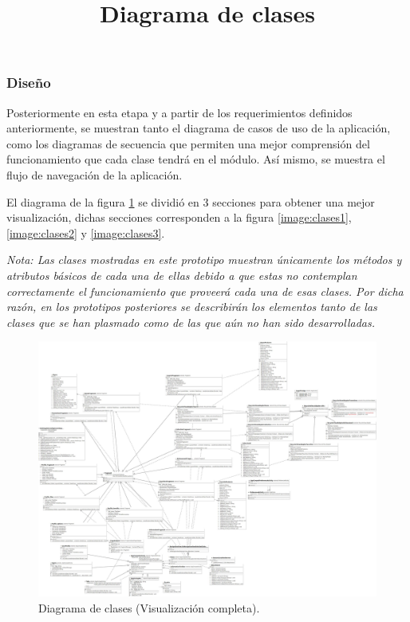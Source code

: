 \subsubsection{Diseño}
Posteriormente en esta etapa y a partir de los requerimientos definidos anteriormente, se muestran tanto el diagrama de casos de uso de la aplicación, como los diagramas de secuencia que permiten una mejor comprensión del funcionamiento que cada clase tendrá en el módulo. Así mismo, se muestra el flujo de navegación de la aplicación.
\\ \par
\title{\textbf{Diagrama de clases}\\ \par}
El diagrama de la figura \ref{image:clases} se dividió en 3 secciones para obtener una mejor visualización, dichas secciones corresponden a la figura \ref{image:clases1}, \ref{image:clases2} y \ref{image:clases3}.\\ \par 
\textit{Nota: Las clases mostradas en este prototipo muestran únicamente los métodos y atributos básicos de cada una de ellas debido a que estas no contemplan correctamente el funcionamiento que proveerá cada una de esas clases. Por dicha razón, en los prototipos posteriores se describirán  los elementos tanto de las clases que se han plasmado como de las que aún no han sido desarrolladas.}
\FloatBarrier
\begin{figure}[htbp!]
		\centering
			\includegraphics[width=1.1 \textwidth]{imagenes/Diagramas_UserApp/Nuevos_diagramas/diagrama2}
		\caption{Diagrama de clases (Visualización completa).}
		\label{image:clases}
\end{figure}
\FloatBarrier

